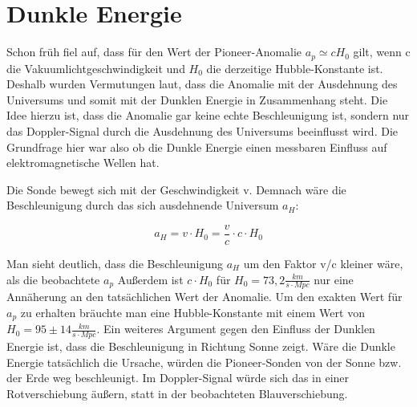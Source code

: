 
\section{Dunkle Energie}


\bigskip

Schon fr\"uh fiel auf, dass f\"ur den Wert der Pioneer-Anomalie
$a_{p}\simeq \mathit{cH}_{0}$ gilt, wenn c die
Vakuumlichtgeschwindigkeit und $H_0$ die
derzeitige Hubble-Konstante ist. Deshalb wurden Vermutungen
laut, dass die Anomalie mit der Ausdehnung des Universums und somit mit
der Dunklen Energie in Zusammenhang steht\cite{Turyshev2010}. Die Idee hierzu ist,
dass die Anomalie gar keine echte Beschleunigung ist, sondern nur das
Doppler-Signal durch die Ausdehnung des Universums beeinflusst wird.
Die Grundfrage hier war also ob die Dunkle Energie einen messbaren
Einfluss auf elektromagnetische Wellen hat.


\bigskip

Die Sonde bewegt sich mit der Geschwindigkeit v. Demnach w\"are
die Beschleunigung durch das sich ausdehnende Universum $a_H$:

\begin{equation*}
a_{H}=v\cdot H_{0}=\frac{v}{c}\cdot c\cdot H_{0}
\end{equation*}

Man sieht deutlich, dass die Beschleunigung
$a_H$ um den Faktor v/c kleiner w\"are,
als die beobachtete $a_p$
Au{\ss}erdem ist $c\cdot H_{0}$ f\"ur 
$H_{0}=73,2\frac{\mathit{km}}{s\cdot \mathit{Mpc}}$ nur eine
Ann\"aherung an den tats\"achlichen Wert der Anomalie. Um den exakten
Wert f\"ur $a_p$ zu erhalten br\"auchte
man eine Hubble-Konstante mit einem Wert von $H_{0}=95\pm
14\frac{\mathit{km}}{s\cdot \mathit{Mpc}}$. Ein weiteres
Argument gegen den Einfluss der Dunklen Energie ist, dass die
Beschleunigung in Richtung Sonne zeigt. W\"are die Dunkle Energie
tats\"achlich die Ursache, w\"urden die Pioneer-Sonden von der Sonne
bzw. der Erde weg beschleunigt. Im Doppler-Signal w\"urde sich das in
einer Rotverschiebung \"au{\ss}ern, statt in der beobachteten
Blauverschiebung.

